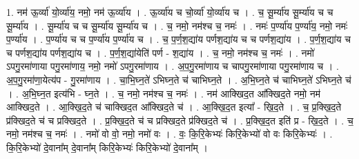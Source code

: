 \documentclass[17pt]{extarticle}
\begin{document}
1. नम॑ ऊ॒र्व्या॑ यो॒र्व्या॑य॒ नमो॒ नम॑ ऊ॒र्व्या॑य । . ऊ॒र्व्या॑य च चो॒र्व्या॑ यो॒र्व्या॑य च । . च॒ सू॒र्म्या॑य सू॒र्म्या॑य च च सू॒र्म्या॑य । . सू॒र्म्या॑य च च सू॒र्म्या॑य सू॒र्म्या॑य च । . च॒ नमो॒ नम॑श्च च॒ नमः॑ । . नमः॑ प॒र्ण्या॑य प॒र्ण्या॑य॒ नमो॒ नमः॑ प॒र्ण्या॑य । . प॒र्ण्या॑य च च प॒र्ण्या॑य प॒र्ण्या॑य च । . च॒ प॒र्ण॒श॒द्या॑य पर्णश॒द्या॑य च च पर्णश॒द्या॑य । . प॒र्ण॒श॒द्या॑य च च पर्णश॒द्या॑य पर्णश॒द्या॑य च । . प॒र्ण॒श॒द्या॑येति॑ पर्ण - श॒द्या॑य । . च॒ नमो॒ नम॑श्च च॒ नमः॑ । . नमो॑ ऽपगु॒रमा॑णाया पगु॒रमा॑णाय॒ नमो॒ नमो॑ ऽपगु॒रमा॑णाय । . अ॒प॒गु॒रमा॑णाय च चापगु॒रमा॑णाया पगु॒रमा॑णाय च । . अ॒प॒गु॒रमा॑णा॒येत्य॑प - गु॒रमा॑णाय । . चा॒भि॒घ्न॒ते॑ ऽभिघ्न॒ते च॑ चाभिघ्न॒ते । . अ॒भि॒घ्न॒ते च॑ चाभिघ्न॒ते॑ ऽभिघ्न॒ते च॑ । . अ॒भि॒घ्न॒त इत्य॑भि - घ्न॒ते । . च॒ नमो॒ नम॑श्च च॒ नमः॑ । . नम॑ आक्खिद॒त आ᳚क्खिद॒ते नमो॒ नम॑ आक्खिद॒ते । . आ॒क्खि॒द॒ते च॑ चाक्खिद॒त आ᳚क्खिद॒ते च॑ । . आ॒क्खि॒द॒त इत्या᳚ - खि॒द॒ते । . च॒ प्र॒क्खि॒द॒ते प्र॑क्खिद॒ते च॑ च प्रक्खिद॒ते । . प्र॒क्खि॒द॒ते च॑ च प्रक्खिद॒ते प्र॑क्खिद॒ते च॑ । . प्र॒क्खि॒द॒त इति॑ प्र - खि॒द॒ते । . च॒ नमो॒ नम॑श्च च॒ नमः॑ । . नमो॑ वो वो॒ नमो॒ नमो॑ वः । . वः॒ कि॒रि॒केभ्यः॑ किरि॒केभ्यो॑ वो वः किरि॒केभ्यः॑ । . कि॒रि॒केभ्यो॑ दे॒वाना᳚म् दे॒वाना᳚म् किरि॒केभ्यः॑ किरि॒केभ्यो॑ दे॒वाना᳚म् । \newline
\end{document}
